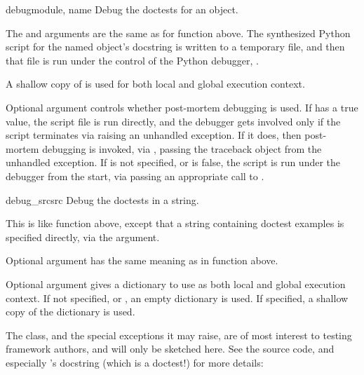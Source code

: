 \begin{funcdesc}{debug}{module, name}
  Debug the doctests for an object.

  The  and  arguments are the same as for function
   above.  The synthesized Python script for the
  named object's docstring is written to a temporary file, and then that
  file is run under the control of the Python debugger, .

  A shallow copy of  is used for both local
  and global execution context.

  Optional argument  controls whether post-mortem debugging is
  used.  If  has a true value, the script file is run directly, and
  the debugger gets involved only if the script terminates via raising an
  unhandled exception.  If it does, then post-mortem debugging is invoked,
  via , passing the traceback object
  from the unhandled exception.  If  is not specified, or is false,
  the script is run under the debugger from the start, via passing an
  appropriate  call to .


\end{funcdesc}

\begin{funcdesc}{debug_src}{src}
  Debug the doctests in a string.

  This is like function  above, except that
  a string containing doctest examples is specified directly, via
  the  argument.

  Optional argument  has the same meaning as in function
   above.

  Optional argument  gives a dictionary to use as both
  local and global execution context.  If not specified, or ,
  an empty dictionary is used.  If specified, a shallow copy of the
  dictionary is used.

\end{funcdesc}

The  class, and the special exceptions it may raise,
are of most interest to testing framework authors, and will only be
sketched here.  See the source code, and especially 's
docstring (which is a doctest!) for more details:

